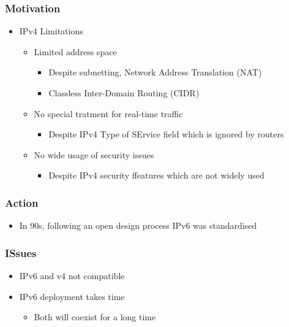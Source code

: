 \subsubsection{Motivation}
\begin{itemize}
	\item IPv4 Limitations
	\begin{itemize}
		\item Limited address space
		\begin{itemize}
			\item Despite subnetting, Network Address
				Translation (NAT)
			\item Classless Inter-Domain Routing (CIDR)
		\end{itemize}
		\item No special tratment for real-time traffic
		\begin{itemize}
			\item Despite IPv4 Type of SErvice field which is
				ignored by routers
		\end{itemize}
		\item No wide usage of security issues
		\begin{itemize}
			\item Despite IPv4 security ffeatures which are not
				widely used
		\end{itemize}
	\end{itemize}
\end{itemize}
\subsubsection{Action}
\begin{itemize}
	\item In 90s, following an open design process IPv6 was standardised
\end{itemize}
\subsubsection{ISsues}
\begin{itemize}
	\item IPv6 and v4 not compatible
	\item IPv6 deployment takes time
	\begin{itemize}
		\item Both will coexist for a long time
	\end{itemize}
\end{itemize}
